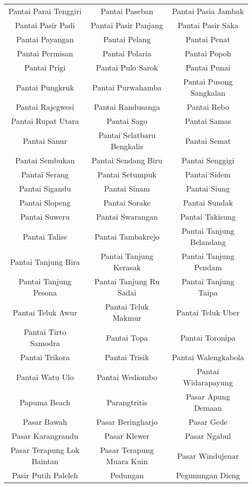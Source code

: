 \begin{table}[H]
	\tiny
	\centering
	\begin{tabular}{ c | c | c}
Pantai Parai Tenggiri & Pantai Paseban & Pantai Pasia Jambak\\
Pantai Pasir Padi & Pantai Pasir Panjang & Pantai Pasir Saka\\
Pantai Payangan & Pantai Pelang & Pantai Penat\\
Pantai Permisan & Pantai Polaria & Pantai Popoh\\
Pantai Prigi & Pantai Pulo Sarok & Pantai Punai\\
Pantai Pungkruk & Pantai Purwahamba & Pantai Pusong Sangkalan\\
Pantai Rajegwesi & Pantai Randusanga & Pantai Rebo\\
Pantai Rupat Utara & Pantai Sago & Pantai Samas\\
Pantai Sanur & Pantai Selatbaru Bengkalis & Pantai Semat\\
Pantai Sembukan & Pantai Sendang Biru & Pantai Senggigi\\
Pantai Serang & Pantai Setumpuk & Pantai Sidem\\
Pantai Sigandu & Pantai Sinam & Pantai Siung\\
Pantai Slopeng & Pantai Sorake & Pantai Sundak\\
Pantai Suweru & Pantai Swarangan & Pantai Takisung\\
Pantai Talise & Pantai Tambakrejo & Pantai Tanjung Belandang\\
Pantai Tanjung Bira & Pantai Tanjung Kerasak & Pantai Tanjung Pendam\\
Pantai Tanjung Pesona & Pantai Tanjung Ru Sadai & Pantai Tanjung Taipa\\
Pantai Teluk Awur & Pantai Teluk Makmur & Pantai Teluk Uber\\
Pantai Tirto Samodra & Pantai Topa & Pantai Toronipa\\
Pantai Trikora & Pantai Trisik & Pantai Walengkabola\\
Pantai Watu Ulo & Pantai Wediombo & Pantai Widarapayung\\
Papuma Beach & Parangtritis & Pasar Apung Demaan\\
Pasar Bawah & Pasar Beringharjo & Pasar Gede\\
Pasar Karangrandu & Pasar Klewer & Pasar Ngabul\\
Pasar Terapung Lok Baintan & Pasar Terapung Muara Kuin & Pasar Windujenar\\
Pasir Putih Paleleh & Pedungan & Pegunungan Dieng\\

\end{tabular}
\end{table}
